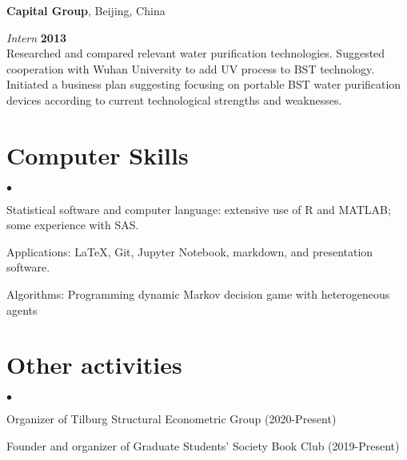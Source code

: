 \documentclass[margin,line]{res}
\newenvironment{list2}{
  \begin{list}{$\bullet$}{%
      \setlength{\itemsep}{0in}
      \setlength{\parsep}{0in} \setlength{\parskip}{0in}
      \setlength{\topsep}{0in} \setlength{\partopsep}{0in} 
      \setlength{\leftmargin}{0.2in}}}{\end{list}}
\begin{document}
\begin{resume}
{\bf Capital Group}, Beijing, China

\vspace{-.3cm}
{\em Intern} \hfill {\bf 2013}\\
Researched and compared relevant water purification technologies. Suggested cooperation with Wuhan University to add UV process to BST technology. Initiated a business plan suggesting focusing on portable BST water purification devices according to current technological strengths and weaknesses.

\section{\sc Computer Skills} 
\begin{list2}
\item Statistical software and computer language:  extensive use of R and MATLAB; some experience with SAS.
\item Applications: \LaTeX, Git, Jupyter Notebook, markdown, and presentation software.
\item Algorithms: Programming dynamic Markov decision game with heterogeneous agents
\end{list2}

\section{\sc Other activities} 
\begin{list2}
\item[] Organizer of Tilburg Structural Econometric Group (2020-Present)
\item[] Founder and organizer of Graduate Students' Society Book Club (2019-Present)
\end{list2}

\end{resume}
\end{document}
